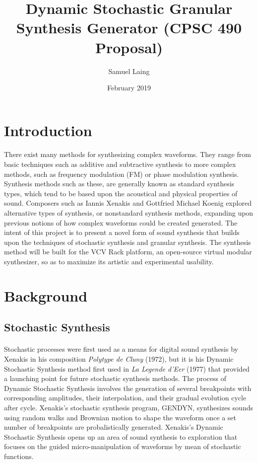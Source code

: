 \documentclass{article}
\title{Dynamic Stochastic Granular Synthesis Generator (CPSC 490 Proposal)}
\author{Samuel Laing}
\date{February 2019}
\begin{document}
\maketitle

\section{Introduction}
\paragraph{}
There exist many methods for synthesizing complex waveforms. They range from basic techniques such as additive and subtractive synthesis to more complex methods, such as frequency modulation (FM) or phase modulation synthesis. Synthesis methods such as these, are generally known as standard synthesis types, which tend to be based upon the acoustical and physical properties of sound. Composers such as Iannis Xenakis and Gottfried Michael Koenig explored alternative types of synthesis, or nonstandard synthesis methods, expanding upon previous notions of how complex waveforms could be created generated. \citep{luc2011dobereiner} The intent of this project is to present a novel form of sound synthesis that builds upon the techniques of stochastic synthesis and granular synthesis. The synthesis method will be built for the VCV Rack platform, an open-source virtual modular synthesizer, so as to maximize its artistic and experimental usability.

\section{Background}
\subsection{Stochastic Synthesis}
\paragraph{}
Stochastic processes were first used as a means for digital sound synthesis by Xenakis in his composition \textit{Polytype de Cluny} (1972), but it is his Dynamic Stochastic Synthesis method first used in \textit{La Legende d'Eer} (1977) that provided a launching point for future stochastic synthesis methods.\citep{sergio2006} The process of Dynamic Stochastic Synthesis involves the generation of several breakpoints with corresponding amplitudes, their interpolation, and their gradual evolution cycle after cycle. Xenakis's stochastic synthesis program, GENDYN, synthesizes sounds using random walks and Brownian motion to shape the waveform once a set number of breakpoints are probalistically generated.\citep{xenakis1992} Xenakis's Dynamic Stochastic Synthesis opens up an area of sound synthesis to exploration that focuses on the guided micro-manipulation of waveforms by mean of stochastic functions.
\end{document}
